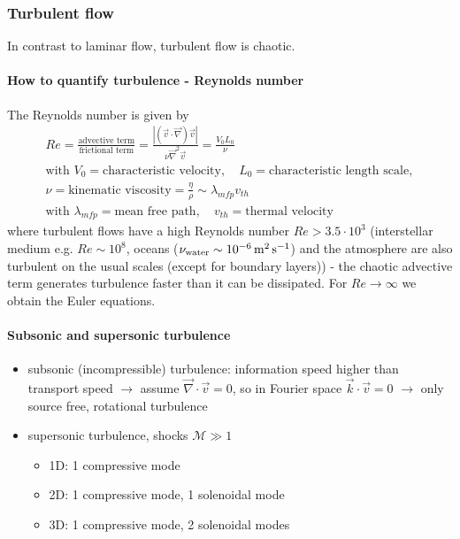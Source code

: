 \subsubsection*{Turbulent flow}
In contrast to laminar flow, turbulent flow is chaotic.

\paragraph*{How to quantify turbulence - Reynolds number} The Reynolds number is given by
\begin{equation}
    \begin{gathered}
        Re = \frac{\text{advective term}}{\text{frictional term}} = \frac{|(\vec{v}\cdot \vec{\nabla})\vec{v}|}{\nu \vec{\nabla}^2 \vec{v}} = \frac{V_0 L_0}{\nu} \\
        \text{with } V_0 = \text{characteristic velocity}, \quad L_0 = \text{characteristic length scale}, \\ \nu = \text{kinematic viscosity} = \frac{\eta}{\rho} \sim \lambda_{mfp} v_{th} \\
        \text{with } \lambda_{mfp} = \text{mean free path}, \quad v_{th} = \text{thermal velocity}
    \end{gathered}
\end{equation}
where turbulent flows have a high Reynolds number $Re > 3.5 \cdot 10^3$ (interstellar medium e.g. $Re \sim 10^8$, oceans ($\nu_\text{water} \sim 10^{-6} \operatorname{m}^2 \operatorname{s}^{-1}$) and
the atmosphere are also turbulent on the usual scales (except for boundary layers))
- the chaotic advective term generates turbulence faster than it can be dissipated. For
$Re \rightarrow \infty$ we obtain the Euler equations.

\paragraph*{Subsonic and supersonic turbulence}
\begin{itemize}
    \item subsonic (incompressible) turbulence: information speed higher than transport speed $\rightarrow$ assume $\vec{\nabla} \cdot \vec{v} = 0$, so in Fourier space $\vec{k} \cdot \vec{v} = 0$  $\rightarrow$ only source free, rotational turbulence
    \item supersonic turbulence, shocks $\mathcal{M} \gg 1$
    \begin{itemize}
        \item 1D: 1 compressive mode
        \item 2D: 1 compressive mode, 1 solenoidal mode
        \item 3D: 1 compressive mode, 2 solenoidal modes
    \end{itemize}
\end{itemize}

